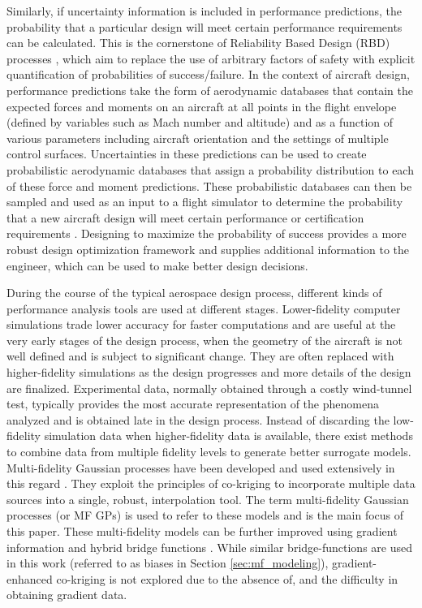 Similarly, if uncertainty information is included in performance predictions, the probability that a particular design will meet certain performance requirements can be calculated. This is the cornerstone of Reliability Based Design (RBD) processes \cite{reliability}, which aim to replace the use of arbitrary factors of safety with explicit quantification of probabilities of success/failure. In the context of aircraft design, performance predictions take the form of aerodynamic databases that contain the expected forces and moments on an aircraft at all points in the flight envelope (defined by variables such as Mach number and altitude) and as a function of various parameters including aircraft orientation and the settings of multiple control surfaces. Uncertainties in these predictions can be used to create probabilistic aerodynamic databases that assign a probability distribution to each of these force and moment predictions. These probabilistic databases can then be sampled and used as an input to a flight simulator to determine the probability that a new aircraft design will meet certain performance or certification requirements \cite{wendorff_combining_2016}. Designing to maximize the probability of success provides a more robust design optimization framework \cite{ng_multifidelity_2014,multif} and supplies additional information to the engineer, which can be used to make better design decisions.

During the course of the typical aerospace design process, different kinds of performance analysis tools are used at different stages. Lower-fidelity computer simulations trade lower accuracy for faster computations and are useful at the very early stages of the design process, when the geometry of the aircraft is not well defined and is subject to significant change. They are often replaced with higher-fidelity simulations as the design progresses and more details of the design are finalized. Experimental data, normally obtained through a costly wind-tunnel test, typically provides the most accurate representation of the phenomena analyzed and is obtained late in the design process. Instead of discarding the low-fidelity simulation data when higher-fidelity data is available, there exist methods to combine data from multiple fidelity levels to generate better surrogate models. Multi-fidelity Gaussian processes have been developed and used extensively in this regard \cite{kennedy_predicting_2000,le_gratiet_recursive_2014}. They exploit the principles of co-kriging to incorporate multiple data sources into a single, robust, interpolation tool. The term multi-fidelity Gaussian processes (or MF GPs) is used to refer to these models and is the main focus of this paper.  These multi-fidelity models can be further improved using gradient information and hybrid bridge functions \cite{han_improving_2013}. While similar bridge-functions are used in this work (referred to as biases in Section \ref{sec:mf_modeling}), gradient-enhanced co-kriging is not explored due to the absence of, and the difficulty in obtaining gradient data.

